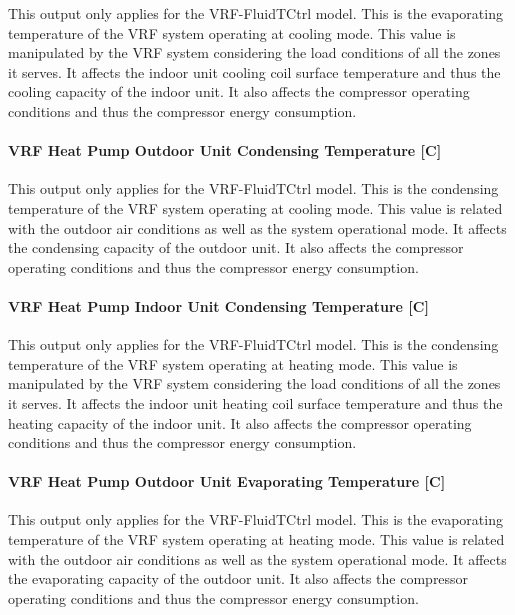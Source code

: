 This output only applies for the VRF-FluidTCtrl model. This is the evaporating temperature of the VRF system operating at cooling mode. This value is manipulated by the VRF system considering the load conditions of all the zones it serves. It affects the indoor unit cooling coil surface temperature and thus the cooling capacity of the indoor unit. It also affects the compressor operating conditions and thus the compressor energy consumption.

\paragraph{VRF Heat Pump Outdoor Unit Condensing Temperature {[}C{]}}\label{vrf-heat-pump-outdoor-unit-condensing-temperature-at-cooling-mode-c}

This output only applies for the VRF-FluidTCtrl model. This is the condensing temperature of the VRF system operating at cooling mode. This value is related with the outdoor air conditions as well as the system operational mode. It affects the condensing capacity of the outdoor unit. It also affects the compressor operating conditions and thus the compressor energy consumption.

\paragraph{VRF Heat Pump Indoor Unit Condensing Temperature {[}C{]}}\label{vrf-heat-pump-indoor-unit-condensing-temperature-at-heating-mode-c}

This output only applies for the VRF-FluidTCtrl model. This is the condensing temperature of the VRF system operating at heating mode. This value is manipulated by the VRF system considering the load conditions of all the zones it serves. It affects the indoor unit heating coil surface temperature and thus the heating capacity of the indoor unit. It also affects the compressor operating conditions and thus the compressor energy consumption.

\paragraph{VRF Heat Pump Outdoor Unit Evaporating Temperature {[}C{]}}\label{vrf-heat-pump-outdoor-unit-evaporating-temperature-at-heating-mode-c}

This output only applies for the VRF-FluidTCtrl model. This is the evaporating temperature of the VRF system operating at heating mode. This value is related with the outdoor air conditions as well as the system operational mode. It affects the evaporating capacity of the outdoor unit. It also affects the compressor operating conditions and thus the compressor energy consumption.

